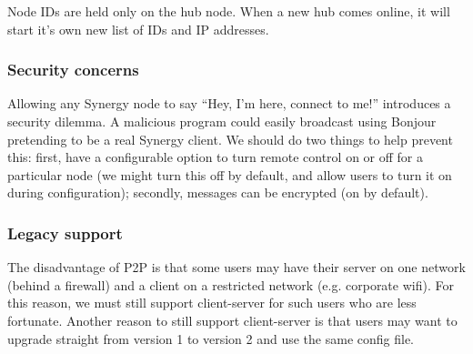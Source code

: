 
Node IDs are held only on the hub node. When a new hub comes online, it will
start it's own new list of IDs and IP addresses.


\subsubsection{Security concerns}

Allowing any Synergy node to say ``Hey, I'm here, connect to me!'' introduces
a security dilemma. A malicious program could easily broadcast using Bonjour
pretending to be a real Synergy client. We should do two things to help prevent
this: first, have a configurable option to turn remote control on or off for
a particular node (we might turn this off by default, and allow users to turn
it on during configuration); secondly, messages can be encrypted (on by 
default).

\subsubsection{Legacy support}

The disadvantage of P2P is that some users may have their server on one network
(behind a firewall) and a client on a restricted network (e.g. corporate wifi).
For this reason, we must still support client-server for such users who are 
less fortunate. Another reason to still support client-server is that users may
want to upgrade straight from version 1 to version 2 and use the same config 
file.

